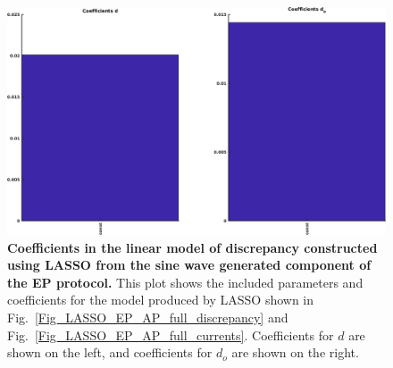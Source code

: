 \documentclass[11pt,a4paper,oneside]{article}
\begin{document}
\clearpage

\begin{figure}[t]
\begin{center}
\includegraphics[scale=0.42]{Figures/LASSO_EP_AP_full_coefficients.png}
\caption{\textbf{Coefficients in the linear model of discrepancy constructed using LASSO from the sine wave generated component of the EP protocol.} This plot shows the included parameters and coefficients for the model produced by LASSO shown in Fig.~\ref{Fig_LASSO_EP_AP_full_discrepancy} and Fig.~\ref{Fig_LASSO_EP_AP_full_currents}. Coefficients for $d$ are shown on the left, and coefficients for $d_o$ are shown on the right.} 
\label{Fig_LASSO_EP_AP_full_coefficients}
\end{center}
\end{figure}
\end{document}
